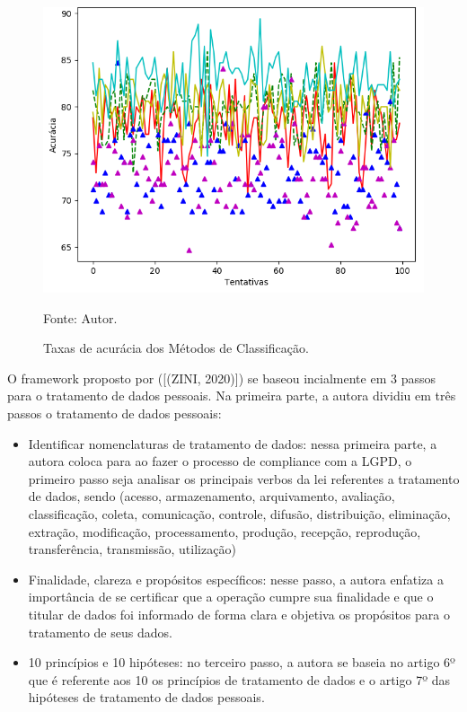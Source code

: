 \documentclass[
	12pt,				%
	openright,			%
	oneside,			%
	a4paper,			%
	english,			%
	french,				%
	spanish,			%
	brazil,				%
	]{abntex2}
\begin{document}
\begin{figure}[ht]
    \centering
    \caption{Taxas de acurácia dos Métodos de Classificação.}
    \includegraphics[width=5.0in]{Images/acc-classification.png}
    \label{fig: grafico-acc}
    
    \centering \small Fonte: Autor.
\end{figure}

O framework proposto por ([(ZINI, 2020)]) se baseou incialmente em 3 passos para o tratamento de dados pessoais. Na primeira parte, a autora dividiu em três passos o tratamento de dados pessoais:

\begin{itemize}
\item Identificar nomenclaturas de tratamento de dados: nessa primeira parte, a autora coloca para ao fazer o processo de compliance com a LGPD, o primeiro passo seja analisar os principais verbos da lei referentes a tratamento de dados, sendo (acesso, armazenamento, arquivamento, avaliação, classificação, coleta, comunicação, controle, difusão, distribuição, eliminação, extração, modificação, processamento, produção, recepção, reprodução, transferência, transmissão, utilização)
\item Finalidade, clareza e propósitos específicos: nesse passo, a autora enfatiza a importância de se certificar que a operação cumpre sua finalidade e que o titular de dados foi informado de forma clara e objetiva os propósitos para o tratamento de seus dados.
\item 10 princípios e 10 hipóteses: no terceiro passo, a autora se baseia no artigo 6º que é referente aos 10 os princípios de tratamento de dados e o artigo 7º das hipóteses de tratamento de dados pessoais.
\end{itemize}
\end{document}
